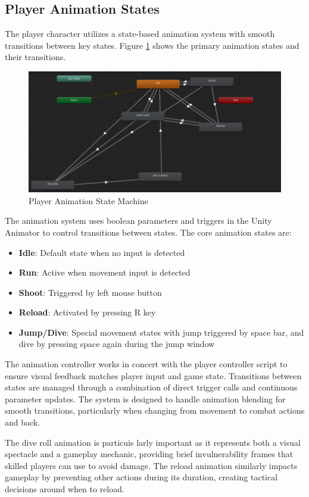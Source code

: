\documentclass{article}
\begin{document}
    \subsection{Player Animation States}
    \label{appendix:player-animation}

    The player character utilizes a state-based animation system with smooth transitions between key states. Figure \ref{fig:player-states} shows the primary animation states and their transitions.

    \begin{figure}[h]
        \centering
        \includegraphics[width=1.2\textwidth]{PlayerState.png}
        \caption{Player Animation State Machine}
        \label{fig:player-states}
    \end{figure}

    The animation system uses boolean parameters and triggers in the Unity Animator to control transitions between states. The core animation states are:

    \begin{itemize}
        \item \textbf{Idle}: Default state when no input is detected
        \item \textbf{Run}: Active when movement input is detected
        \item \textbf{Shoot}: Triggered by left mouse button
        \item \textbf{Reload}: Activated by pressing R key
        \item \textbf{Jump/Dive}: Special movement states with jump triggered by space bar, and dive by pressing space again during the jump window
    \end{itemize}

    The animation controller works in concert with the player controller script to ensure visual feedback matches player input and game state. Transitions between states are managed through a combination of direct trigger calls and continuous parameter updates. The system is designed to handle animation blending for smooth transitions, particularly when changing from movement to combat actions and back.

    The dive roll animation is particuis larly important as it represents both a visual spectacle and a gameplay mechanic, providing brief invulnerability frames that skilled players can use to avoid damage. The reload animation similarly impacts gameplay by preventing other actions during its duration, creating tactical decisions around when to reload.

    
    
\end{document}
